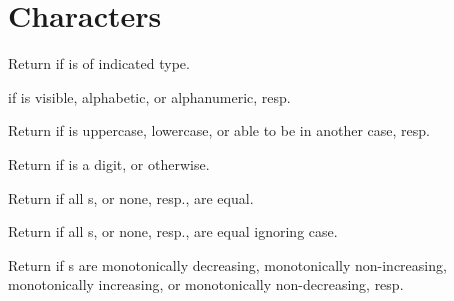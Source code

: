 %
%

\section{Characters} 

\begin{LIST}{1cm}

  Return \retval{\T} if  is of indicated type.

  \retval{\T} if  is visible, alphabetic, or
  alphanumeric, resp.

  Return \retval{\T} if  is uppercase, lowercase, or
  able to be in another case, resp.

  Return  if  is a digit, or
  \retval{\NIL} otherwise.

  Return \retval{\T} if all s, or
  none, resp.,  are equal.

  Return \retval{\T} if all s, or
  none, resp.,  are equal ignoring case.

  Return \retval{\T} if s are
  monotonically decreasing, monotonically non-increasing, monotonically
  increasing, or monotonically non-decreasing, resp.


\end{LIST}
